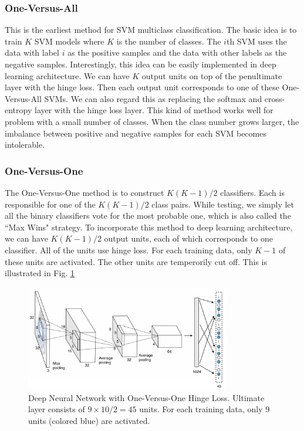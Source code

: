 \documentclass{article} %
\begin{document}
\subsubsection{One-Versus-All}
This is the earliest method for SVM multiclass classification. The basic idea is to train $K$ SVM models where $K$ is the number of classes. The $i$th SVM uses the data with label $i$ as the positive samples and the data with other labels as the negative samples. Interestingly, this idea can be easily implemented in deep learning architecture. We can have $K$ output units on top of the penultimate layer with the hinge loss. Then each output unit corresponds to one of
these One-Versus-All SVMs. We can also regard this as replacing the softmax and cross-entropy layer with the hinge loss layer. This kind of method works well for problem with a small number of classes. When the class number grows larger, the imbalance between positive and negative samples for each SVM becomes intolerable.

\subsubsection{One-Versus-One}
The One-Versus-One method is to construct $K(K-1)/2$ classifiers. Each is responsible for one of the $K(K-1)/2$ class pairs. While testing, we simply let all the binary classifiers vote for the most probable one, which is also called the ``Max Wins" strategy. To incorporate this method to deep learning architecture, we can have $K(K-1)/2$ output units, each of which corresponds to one classifier. All of the units use hinge loss. For each training data, only $K-1$ of these units
are activated. The other units are temperorily cut off. This is illustrated in Fig. \ref{mcsvm} 
\begin{figure}
\centering 
\includegraphics[width=0.8\textwidth]{MCSVM.png}
\caption{ Deep Neural Network with One-Versus-One Hinge Loss. Ultimate layer consists of $9\times 10/2=45$ units. For each training data, only 9 units (colored blue) are activated.}
\label{mcsvm} 
\end{figure}
\end{document}
